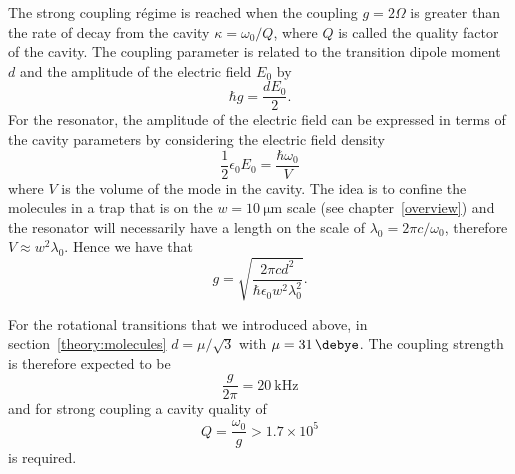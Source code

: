 The strong coupling r\'egime is reached when the coupling $g=2\Omega$ is
greater than the rate of decay from the cavity $\kappa = \omega_0 / Q$, where
$Q$ is called the quality factor of the cavity. The coupling parameter is
related to the transition dipole moment $d$ and the amplitude of the electric
field $E_0$ by
%
\begin{equation}
  \hbar g = \frac{d E_0}{2}.
\end{equation}
%
For the resonator, the amplitude of the electric field can be expressed in
terms of the cavity parameters by considering the electric field density
%
\begin{equation}
  \frac{1}{2} \epsilon_0 E_0 = \frac{\hbar \omega_0}{V}
\end{equation}
%
where $V$ is the volume of the mode in the cavity. The idea is to confine the
molecules in a trap that is on the $w=\SI{10}{\micro\meter}$ scale (see
chapter~\ref{overview}) and the resonator will necessarily have a length on the
scale of $\lambda_0 = 2\pi c / \omega_0$, therefore $V\approx w^2\lambda_0$.
Hence we have that
%
\begin{equation}
  g = \sqrt{\frac{2\pi c d^2}{\hbar \epsilon_0 w^2 \lambda_0^2}}.
\end{equation}

For the rotational \CaF{} transitions that we introduced above, in
section~\ref{theory:molecules} $d = \mu/\sqrt{3}$ with $\mu =
\SI{31}{\debye}$.
%
The coupling strength is therefore expected to be
%
\begin{equation}
  \frac{g}{2\pi} = \SI{20}{\kilo\hertz}
\end{equation}
%
and for strong coupling a cavity quality of
%
\begin{equation}
  Q = \frac{\omega_0}{g} > 1.7 \times 10^5
\end{equation}
%
is required.
